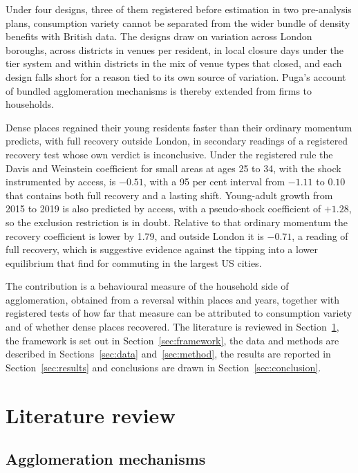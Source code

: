 \documentclass[11pt,a4paper]{article}
\begin{document}
Under four designs, three of them registered before estimation in two pre-analysis plans, consumption variety cannot be separated from the wider bundle of density benefits with British data. The designs draw on variation across London boroughs, across districts in venues per resident, in local closure days under the tier system and within districts in the mix of venue types that closed, and each design falls short for a reason tied to its own source of variation. Puga's account of bundled agglomeration mechanisms \citep{puga2010} is thereby extended from firms to households.

Dense places regained their young residents faster than their ordinary momentum predicts, with full recovery outside London, in secondary readings of a registered recovery test whose own verdict is inconclusive. Under the registered rule the Davis and Weinstein coefficient for small areas at ages 25 to 34, with the shock instrumented by access, is $-0.51$, with a 95 per cent interval from $-1.11$ to $0.10$ that contains both full recovery and a lasting shift. Young-adult growth from 2015 to 2019 is also predicted by access, with a pseudo-shock coefficient of $+1.28$, so the exclusion restriction is in doubt. Relative to that ordinary momentum the recovery coefficient is lower by 1.79, and outside London it is $-0.71$, a reading of full recovery, which is suggestive evidence against the tipping into a lower equilibrium that \citet{monte2026} find for commuting in the largest US cities.

The contribution is a behavioural measure of the household side of agglomeration, obtained from a reversal within places and years, together with registered tests of how far that measure can be attributed to consumption variety and of whether dense places recovered. The literature is reviewed in Section~\ref{sec:lit}, the framework is set out in Section~\ref{sec:framework}, the data and methods are described in Sections~\ref{sec:data} and~\ref{sec:method}, the results are reported in Section~\ref{sec:results} and conclusions are drawn in Section~\ref{sec:conclusion}.

\section{Literature review}\label{sec:lit}

\subsection{Agglomeration mechanisms}
\end{document}
